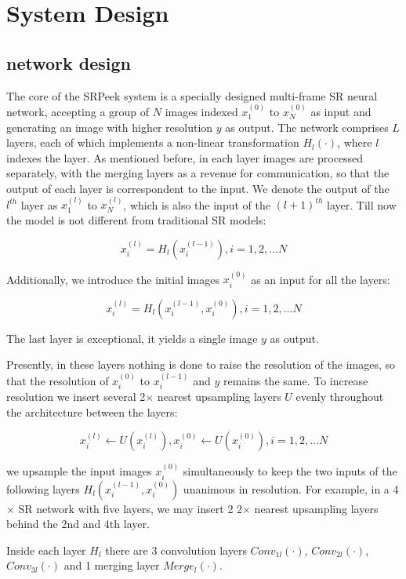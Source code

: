 \section{System Design}
\label{sec-design}

\subsection{network design}
The core of the \textsf{SRPeek} system is a specially designed multi-frame SR neural network, accepting a group of $N$ images indexed $x_1^{(0)}$ to $x_N^{(0)}$ as input and generating an image with higher resolution $y$ as output. The network comprises $L$ layers, each of which implements a non-linear transformation $H_l(\cdot)$, where $l$ indexes the layer. As mentioned before, in each layer images are processed separately, with the merging layers as a revenue for communication, so that the output of each layer is correspondent to the input.  We denote the output of the $l^{th}$ layer as $x_1^{(l)}$ to $x_N^{(l)}$, which is also the input of the $(l+1)^{th}$ layer. Till now the model is not different from traditional SR models:

$$x_i^{(l)} = H_l(x_i^{(l-1)}), i=1,2,...N$$


Additionally, we introduce the initial images $x_i^{(0)}$ as an input for all the layers:

$$x_i^{(l)} = H_l(x_i^{(l-1)},x_i^{(0)}), i=1,2,...N$$

The last layer is exceptional, it yields a single image $y$ as output. 

Presently, in these layers nothing is done to raise the resolution of the images, so that the resolution of $x_i^{(0)}$ to $x_i^{(l-1)}$ and $y$ remains the same. To increase resolution we insert several 2$\times$ nearest upsampling layers $U$ evenly throughout the architecture between the layers:

$$x_i^{(l)} \leftarrow U(x_i^{(l)}), x_i^{(0)} \leftarrow U(x_i^{(0)}), i=1,2,...N$$

we upsample the input images $x_i^{(0)}$ simultaneously to keep the two inputs of the following layers $H_l(x_i^{(l-1)},x_i^{(0)})$ unanimous in resolution. For example, in a 4$\times$ SR network with five layers, we may insert 2 2$\times$ nearest upsampling layers behind the 2nd and 4th layer.

Inside each layer $H_l$ there are 3 convolution layers $Conv_{1l}(\cdot)$, $Conv_{2l}(\cdot)$, $Conv_{3l}(\cdot)$ and 1 merging layer $Merge_l(\cdot)$.

